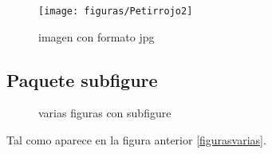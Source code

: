 \documentclass[12pt]{article}
\begin{document}
\begin{figure}[H]
\centering
\texttt{[image: figuras/Petirrojo2]}
\caption{imagen con formato jpg}
\label{figura3}
\end{figure}

\newpage
\subsection{Paquete subfigure}

\begin{figure}[!ht]
\centering
{}
\quad
{}
\quad
{}
\caption{varias figuras con subfigure}
\label{figurasvarias}
\end{figure}

Tal como aparece en la figura anterior \eqref{figurasvarias}.
\end{document}
